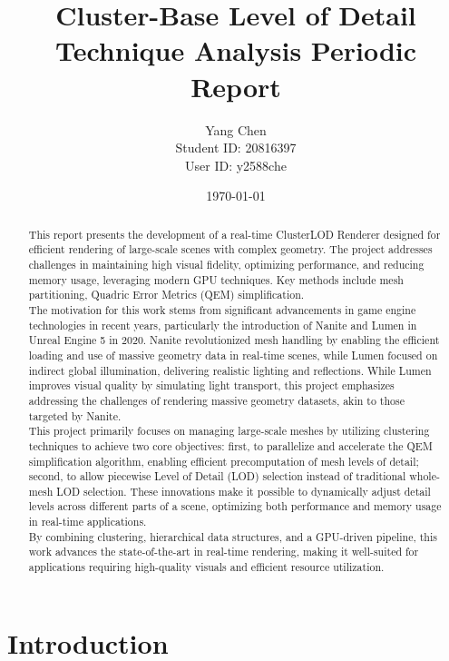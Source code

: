 \documentclass[12pt]{extarticle}
\title{Cluster-Base Level of Detail Technique Analysis Periodic Report}
\author{Yang Chen \\ Student ID: 20816397 \\ User ID: y2588che}
\date{\today}
\newcommand{\customnewline}{\\[1.5em]}
\begin{document}
\maketitle
\newpage

\begin{abstract}
This report presents the development of a real-time ClusterLOD Renderer designed for efficient rendering of large-scale scenes 
with complex geometry. The project addresses challenges in maintaining high visual fidelity, optimizing performance, and 
reducing memory usage, leveraging modern GPU techniques. Key methods include mesh partitioning, Quadric Error Metrics (QEM) simplification.
\customnewline
The motivation for this work stems from significant advancements in game engine technologies in recent years, particularly the 
introduction of Nanite and Lumen in Unreal Engine 5 in 2020. Nanite revolutionized mesh handling by enabling the efficient 
loading and use of massive geometry data in real-time scenes, while Lumen focused on indirect global illumination, delivering 
realistic lighting and reflections. While Lumen improves visual quality by simulating light transport, this project emphasizes 
addressing the challenges of rendering massive geometry datasets, akin to those targeted by Nanite.
\customnewline
This project primarily focuses on managing large-scale meshes by utilizing clustering techniques to achieve two core objectives:
first, to parallelize and accelerate the QEM simplification algorithm, enabling efficient precomputation of mesh levels of 
detail; second, to allow piecewise Level of Detail (LOD) selection instead of traditional whole-mesh LOD selection. These 
innovations make it possible to dynamically adjust detail levels across different parts of a scene, optimizing both performance 
and memory usage in real-time applications.
\customnewline
By combining clustering, hierarchical data structures, and a GPU-driven pipeline, this work advances the state-of-the-art in 
real-time rendering, making it well-suited for applications requiring high-quality visuals and efficient resource utilization.
\end{abstract}

\newpage

\tableofcontents
\newpage

\section{Introduction}
\end{document}
